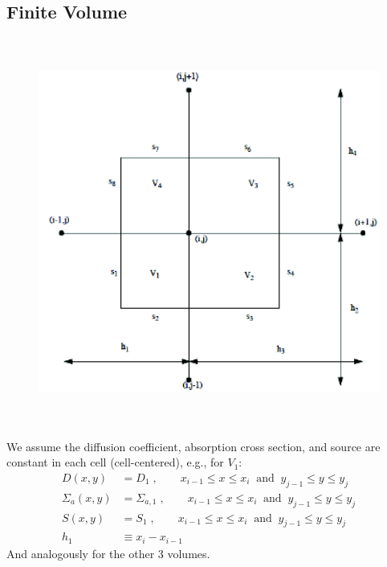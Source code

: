 \documentclass[12pt]{article}
\begin{document}
\subsection{Finite Volume}

\begin{figure}[h!]
\begin{center}
\includegraphics[height=5in]{2DfvmGrid}
\end{center}
\end{figure}

We assume the diffusion coefficient, absorption cross section, and source are constant in each cell (cell-centered), e.g., for $V_1$:
\begin{align}
D(x,y) &= D_{1}\;, \qquad x_{i-1} \leq x \leq x_i \:\text{ and }\: y_{j-1} \leq y \leq y_j \nonumber \\
%
\Sigma_a(x,y) &= \Sigma_{a,1}\;, \qquad x_{i-1} \leq x \leq x_i \:\text{ and }\: y_{j-1} \leq y \leq y_j \nonumber \\
%
S(x,y) &= S_{1}\;, \qquad x_{i-1} \leq x \leq x_i \:\text{ and }\: y_{j-1} \leq y \leq y_j \nonumber \\
%
h_1 &\equiv x_{i} - x_{i-1} \nonumber 
\end{align}
And analogously for the other 3 volumes.
\end{document}
